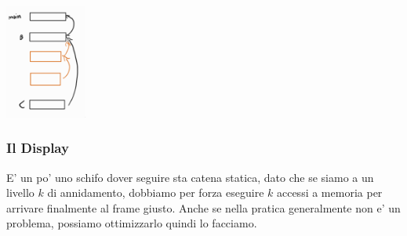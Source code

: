 \begin{center}
  \includegraphics[width=0.2\textwidth]{img/2025-03-06-13-14-42.png}
\end{center}

\subsubsection{Il Display}

E' un po' uno schifo dover seguire sta catena statica, dato che se siamo a un livello $ k $ di annidamento, dobbiamo per forza eseguire $ k $ accessi a memoria per arrivare finalmente al frame giusto. Anche se nella pratica generalmente non e' un problema, possiamo ottimizzarlo quindi lo facciamo.



% 
